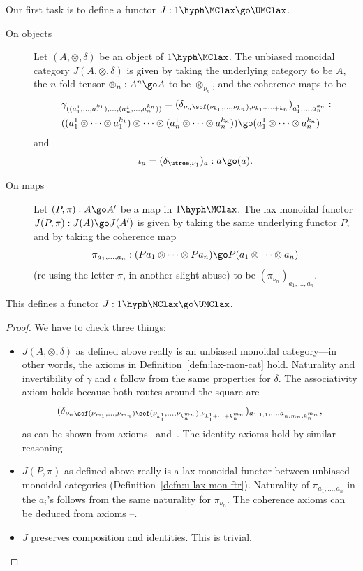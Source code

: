 Our first task is to define a functor $J: 1\hyph\MClax \go \UMClax$.
%
\begin{description}
\item[On objects] Let $(A, \otimes, \delta)$ be an object of
$1\hyph\MClax$.  The unbiased monoidal category $J(A, \otimes, \delta)$ is
given by taking the underlying category to be $A$, the $n$-fold tensor
$\otimes_n: A^n \go A$ to be $\otimes_{\nu_n}$, and the coherence maps to
be
%
\begin{eqnarray*}
\lefteqn{\gamma_{((a_1^1, \ldots, a_1^{k_1}), \ldots, (a_n^1, \ldots, a_n^{k_n}))}
=
(\delta_{\nu_n \sof (\nu_{k_1}, \ldots, \nu_{k_n}), 
\nu_{k_1 + \cdots + k_n}})_{a_1^1, \ldots, a_n^{k_n}}:}	\\
&((a_1^1 \otimes\cdots\otimes a_1^{k_1}) \otimes\cdots\otimes
(a_n^1 \otimes\cdots\otimes a_n^{k_n}))
\go
(a_1^1 \otimes\cdots\otimes a_n^{k_n})
\end{eqnarray*}
% 
and
\[
\iota_a = (\delta_{\utree, \nu_1})_a: a \go (a).
\]
%
\item[On maps] Let $(P, \pi): A \go A'$ be a map in $1\hyph\MClax$.  The
lax monoidal functor $J(P, \pi): J(A) \go J(A')$ is given by taking the
same underlying functor $P$, and by taking the coherence map
\[
\pi_{a_1, \ldots, a_n}:
(Pa_1 \otimes \cdots \otimes Pa_n) 
\go
P(a_1 \otimes\cdots\otimes a_n)
\]
(re-using the letter $\pi$, in another slight abuse) to be
$(\pi_{\nu_n})_{a_1, \ldots, a_n}$. 
\end{description}

\begin{lemma}
This defines a functor $J: 1\hyph\MClax \go \UMClax$.
\end{lemma}

\begin{proof} 
We have to check three things:
%
\begin{itemize}
\item $J(A,\otimes,\delta)$ as defined above really is an unbiased
monoidal category---in other words, the axioms in
Definition~\ref{defn:lax-mon-cat} hold.  Naturality and invertibility of
$\gamma$ and $\iota$  follow from the same properties for $\delta$. The
associativity axiom holds because both routes around the square are
\[
(\delta_{ \nu_n\sof (\nu_{m_1}, \ldots, \nu_{m_n}) \sof (\nu_{k_1^1},
\ldots, \nu_{k_n^{m_n}}), \nu_{k_1^1 + \cdots + k_n^{m_n}}})_%
{a_{1,1,1}, \ldots, a_{n,m_n,k_n^{m_n}}},
\]
as can be shown from axioms~ and~.  The identity
axioms hold by similar reasoning.
\item $J(P, \pi)$ as defined above really is a lax monoidal functor between
unbiased monoidal categories (Definition~\ref{defn:u-lax-mon-ftr}).
Naturality of $\pi_{a_1, \ldots, a_n}$ in the $a_i$'s follows from the same
naturality for $\pi_{\nu_n}$.  The coherence axioms can be deduced from
axioms --.
\item $J$ preserves composition and identities.  This is trivial.
\done
\end{itemize}
\end{proof}

